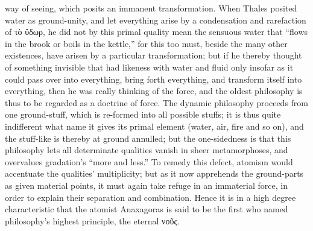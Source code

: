 \documentclass[12pt]{book}
\begin{document}
way of seeing, which posits an immanent transformation. When Thales posited
water as ground-unity, and let everything arise by a condensation and
rarefaction of τὸ ὕδωρ, he did not by this primal quality mean the sensuous
water that ``flows in the brook or boils in the kettle,'' for this too must,
beside the many other existences, have arisen by a particular
transformation; but if he thereby thought of something invisible that had
likeness with water and fluid only insofar as it could pass over into
everything, bring forth everything, and transform itself into everything,
then he was really thinking of the force, and the oldest philosophy is thus
to be regarded as a doctrine of force. The dynamic philosophy proceeds from
one ground-stuff, which is re-formed into all possible stuffs; it is thus
quite indifferent what name it gives its primal element (water, air, fire
and so on), and the stuff-like is thereby at ground annulled; but the
one-sidedness is that this philosophy lets all determinate qualities vanish
in sheer metamorphoses, and overvalues gradation's ``more and less.'' To
remedy this defect, atomism would accentuate the qualities' multiplicity;
but as it now apprehends the ground-parts as given material points, it must
again take refuge in an immaterial force, in order to explain their
separation and combination. Hence it is in a high degree characteristic that
the atomist Anaxagoras is said to be the first who named philosophy's
highest principle, the eternal νοῦς.
\end{document}
